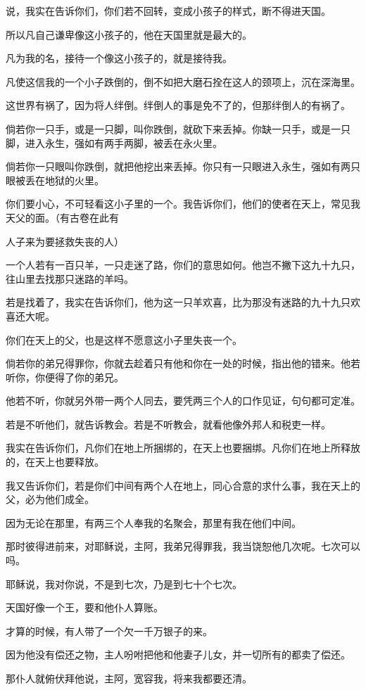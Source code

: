 \documentclass[12pt,oneside]{book}
\begin{document}
说，我实在告诉你们，你们若不回转，变成小孩子的样式，断不得进天国。

所以凡自己谦卑像这小孩子的，他在天国里就是最大的。

凡为我的名，接待一个像这小孩子的，就是接待我。

凡使这信我的一个小子跌倒的，倒不如把大磨石拴在这人的颈项上，沉在深海里。

这世界有祸了，因为将人绊倒。绊倒人的事是免不了的，但那绊倒人的有祸了。

倘若你一只手，或是一只脚，叫你跌倒，就砍下来丢掉。你缺一只手，或是一只脚，进入永生，强如有两手两脚，被丢在永火里。

倘若你一只眼叫你跌倒，就把他挖出来丢掉。你只有一只眼进入永生，强如有两只眼被丢在地狱的火里。

你们要小心，不可轻看这小子里的一个。我告诉你们，他们的使者在天上，常见我天父的面。（有古卷在此有

人子来为要拯救失丧的人）

一个人若有一百只羊，一只走迷了路，你们的意思如何。他岂不撇下这九十九只，往山里去找那只迷路的羊吗。

若是找着了，我实在告诉你们，他为这一只羊欢喜，比为那没有迷路的九十九只欢喜还大呢。

你们在天上的父，也是这样不愿意这小子里失丧一个。

倘若你的弟兄得罪你，你就去趁着只有他和你在一处的时候，指出他的错来。他若听你，你便得了你的弟兄。

他若不听，你就另外带一两个人同去，要凭两三个人的口作见证，句句都可定准。

若是不听他们，就告诉教会。若是不听教会，就看他像外邦人和税吏一样。

我实在告诉你们，凡你们在地上所捆绑的，在天上也要捆绑。凡你们在地上所释放的，在天上也要释放。

我又告诉你们，若是你们中间有两个人在地上，同心合意的求什么事，我在天上的父，必为他们成全。

因为无论在那里，有两三个人奉我的名聚会，那里有我在他们中间。

那时彼得进前来，对耶稣说，主阿，我弟兄得罪我，我当饶恕他几次呢。七次可以吗。

耶稣说，我对你说，不是到七次，乃是到七十个七次。

天国好像一个王，要和他仆人算账。

才算的时候，有人带了一个欠一千万银子的来。

因为他没有偿还之物，主人吩咐把他和他妻子儿女，并一切所有的都卖了偿还。

那仆人就俯伏拜他说，主阿，宽容我，将来我都要还清。
\end{document}
